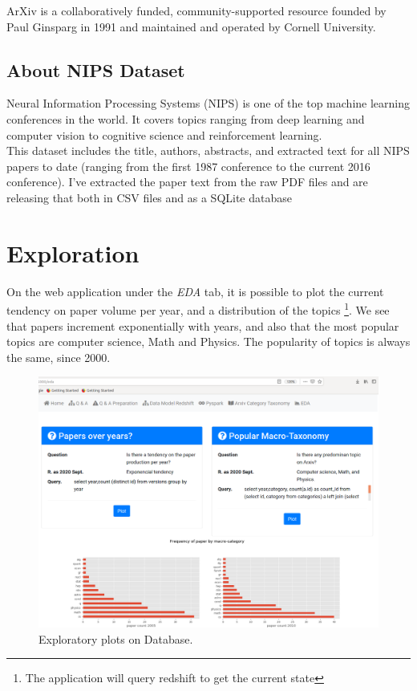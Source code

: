 ArXiv is a collaboratively funded, community-supported resource founded by Paul Ginsparg in 1991 and maintained and operated by Cornell University.\\

\subsection{About NIPS Dataset}
Neural Information Processing Systems (NIPS) is one of the top machine learning conferences in the world. It covers topics ranging from deep learning and computer vision to cognitive science and reinforcement learning.\\

This dataset includes the title, authors, abstracts, and extracted text for all NIPS papers to date (ranging from the first 1987 conference to the current 2016 conference). I've extracted the paper text from the raw PDF files and are releasing that both in CSV files and as a SQLite database\\

\section{Exploration}

On the web application under the \emph{EDA} tab, it is possible to plot the current tendency on paper volume per year, and a distribution
of the topics \footnote{The application will query redshift to get the current state}. We see that papers increment exponentially with years, and also that the most popular topics are computer science, Math and Physics. The popularity of topics is always the same, since 2000.


\begin{figure}
\centering
\includegraphics[width=1\linewidth]{images/4_eda}
\caption{Exploratory plots on Database.}
\label{fig:4_eda}
\end{figure}


